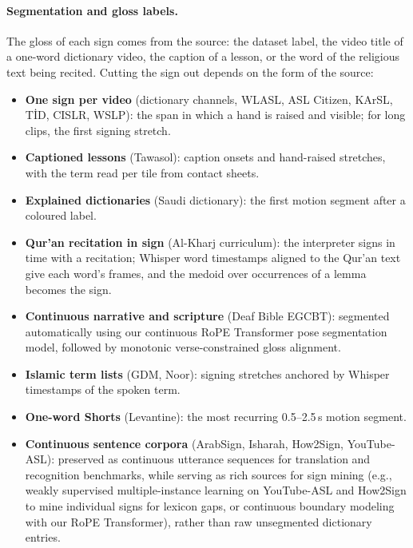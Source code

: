 \paragraph{Segmentation and gloss labels.} The gloss of each sign comes from the source: the dataset label, the video
title of a one-word dictionary video, the caption of a lesson, or the word of the religious text being recited. Cutting the sign
out depends on the form of the source:
\begin{itemize}[leftmargin=*,itemsep=1pt]
  \item \textbf{One sign per video} (dictionary channels, WLASL, ASL Citizen, KArSL, T\.{I}D, CISLR, WSLP): the span in
        which a hand is raised and visible; for long clips, the first signing stretch.
  \item \textbf{Captioned lessons} (Tawasol): caption onsets and hand-raised stretches, with the term read per tile
        from contact sheets.
  \item \textbf{Explained dictionaries} (Saudi dictionary): the first motion segment after a coloured label.
  \item \textbf{Qur'an recitation in sign} (Al-Kharj curriculum): the interpreter signs in time with a recitation;
        Whisper word timestamps aligned to the Qur'an text give each word's frames, and the medoid over occurrences of a
        lemma becomes the sign.
  \item \textbf{Continuous narrative and scripture} (Deaf Bible EGCBT): segmented automatically using our continuous
        RoPE Transformer pose segmentation model, followed by monotonic verse-constrained gloss alignment.
  \item \textbf{Islamic term lists} (GDM, Noor): signing stretches anchored by Whisper timestamps of the spoken term.
  \item \textbf{One-word Shorts} (Levantine): the most recurring 0.5--2.5\,s motion segment.
  \item \textbf{Continuous sentence corpora} (ArabSign, Isharah, How2Sign, YouTube-ASL): preserved as continuous utterance sequences for translation and recognition benchmarks, while serving as rich sources for sign mining (e.g., weakly supervised multiple-instance learning on YouTube-ASL and How2Sign to mine individual signs for lexicon gaps, or continuous boundary modeling with our RoPE Transformer), rather than raw unsegmented dictionary entries.
\end{itemize}

